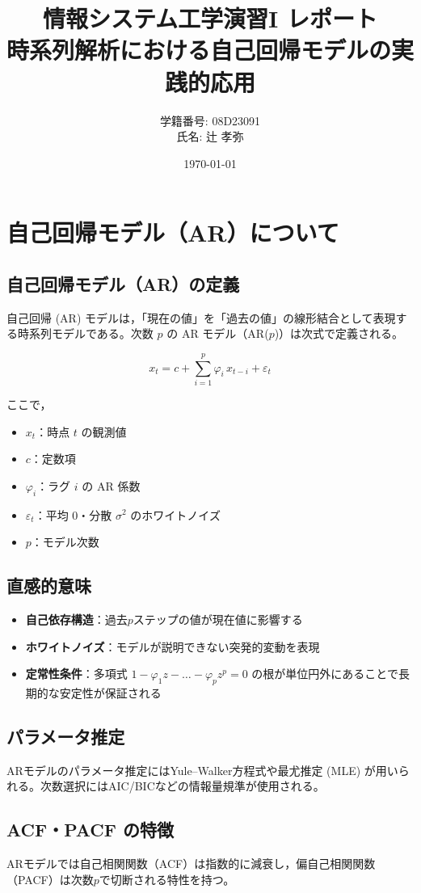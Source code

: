 \documentclass[12pt]{article}
\title{情報システム工学演習I レポート\\時系列解析における自己回帰モデルの実践的応用}
\author{学籍番号: 08D23091 \\ 氏名: 辻 孝弥}
\date{\today}
\begin{document}
\maketitle

\section{自己回帰モデル（AR）について}

\subsection{自己回帰モデル（AR）の定義}

自己回帰 (AR) モデルは，「現在の値」を「過去の値」の線形結合として表現する時系列モデルである。次数 $p$ の AR モデル（AR($p$)）は次式で定義される。

\[
x_t = c + \sum_{i=1}^{p} \varphi_i\,x_{t-i} + \varepsilon_t
\]

ここで，
\begin{itemize}
\item $x_t$：時点 $t$ の観測値
\item $c$：定数項
\item $\varphi_i$：ラグ $i$ の AR 係数
\item $\varepsilon_t$：平均 0・分散 $\sigma^2$ のホワイトノイズ
\item $p$：モデル次数
\end{itemize}

\subsection{直感的意味}
\begin{itemize}
\item \textbf{自己依存構造}：過去$p$ステップの値が現在値に影響する
\item \textbf{ホワイトノイズ}：モデルが説明できない突発的変動を表現
\item \textbf{定常性条件}：多項式 $1-\varphi_1 z-\dots-\varphi_p z^p=0$ の根が単位円外にあることで長期的な安定性が保証される
\end{itemize}

\subsection{パラメータ推定}
ARモデルのパラメータ推定にはYule–Walker方程式や最尤推定 (MLE) が用いられる。次数選択にはAIC/BICなどの情報量規準が使用される。

\subsection{ACF・PACF の特徴}
ARモデルでは自己相関関数（ACF）は指数的に減衰し，偏自己相関関数（PACF）は次数$p$で切断される特性を持つ。
\end{document}
